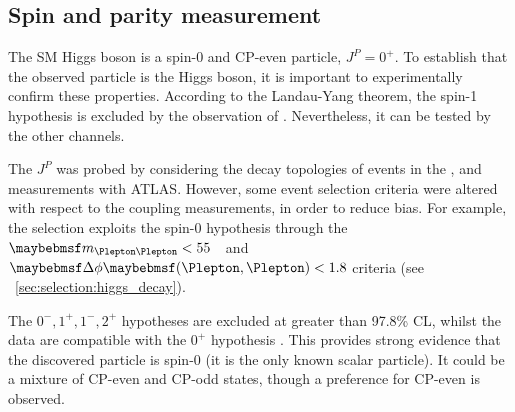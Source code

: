 \subsection{Spin and parity measurement}
\label{sec:searches:spin}

The SM Higgs boson is a spin-0 and CP-even particle, \ie $J^P = 0^+$. To establish that 
the observed particle is the Higgs boson, it is important to experimentally confirm these 
properties. According to the Landau-Yang theorem, the spin-1 hypothesis is excluded by 
the observation of \HepProcess{\PHiggs \HepTo \Pphoton\Pphoton} 
\cite{Landau:1948,Yang:1950}. Nevertheless, it can be tested by the other channels.

The $J^P$ was probed by considering the decay topologies of events in the 
\HepProcess{\PHiggs \HepTo \PZ\PZ}, \HWW and \HepProcess{\PHiggs \HepTo \Pphoton\Pphoton} 
measurements with ATLAS. However, some event selection criteria were altered with respect 
to the coupling measurements, in order to reduce bias. For example, the \HWW selection 
exploits the spin-0 hypothesis through the \unit{$\mll < 55$}{\GeV} and $\dphill < 1.8$ 
criteria (see \Section~\ref{sec:selection:higgs_decay}).

The $0^-, 1^+, 1^-, 2^+$ hypotheses are excluded at greater than 97.8\% CL, whilst the 
data are compatible with the $0^+$ hypothesis \cite{ATLAS:spin}. This provides strong 
evidence that the discovered particle is spin-0 (it is the only known scalar particle). 
It could be a mixture of CP-even and CP-odd states, though a preference for CP-even is 
observed.


